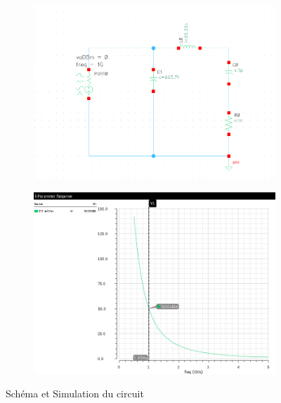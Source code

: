 \documentclass[a4paper]{article}
\begin{document}
\begin{figure}[!htb]
  \begin{subfigure}[t]{.5\linewidth}
      \centering
      \includegraphics[width=1.1\linewidth]{Circuit-C1.png}
      \label{fig:c1circuit}
  \end{subfigure}%
  \begin{subfigure}[t]{.5\linewidth}
    \centering
    \includegraphics[width=1\linewidth]{Circuit-C1-sim.png}
    \label{fig:c1circuit-sim}
  \end{subfigure}%
  \caption{Sch\'ema et Simulation du circuit}
  \label{fig:C1-sim}
\end{figure}
\end{document}
